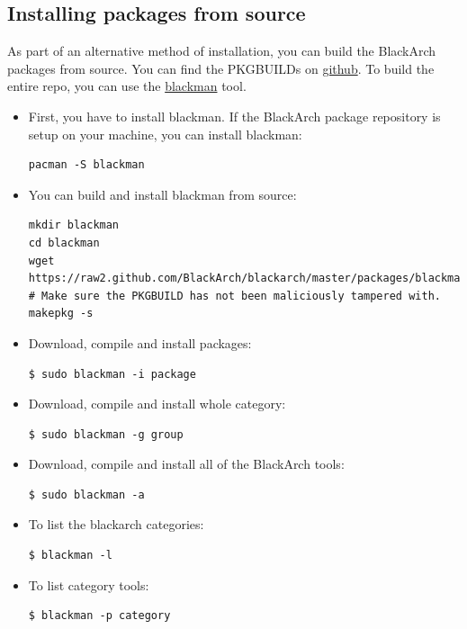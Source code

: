 \documentclass[a4paper, oneside, 11pt]{book}
\begin{document}
\subsection{Installing packages from source}
As part of an alternative method of installation, you can build the BlackArch
packages from source. You can find the PKGBUILDs on
\href{https://github.com/BlackArch/blackarch/tree/master/packages}{github}. To
build the entire repo, you can use the
\href{https://github.com/BlackArch/blackman}{blackman} tool.
\begin{itemize}
\item First, you have to install blackman. If the BlackArch package repository
is setup on your machine, you can install blackman:
{\small
\begin{verbatim}
pacman -S blackman
\end{verbatim}
}
\item You can build and install blackman from source:
{\small
\color{gray}
\begin{verbatim}
mkdir blackman
cd blackman
wget https://raw2.github.com/BlackArch/blackarch/master/packages/blackman/PKGBUILD
# Make sure the PKGBUILD has not been maliciously tampered with.
makepkg -s
\end{verbatim}
}
\item Download, compile and install packages:
{\small
\color{gray}
\begin{verbatim}
$ sudo blackman -i package
\end{verbatim}
}
\item Download, compile and install whole category:
{\small
\color{gray}
\begin{verbatim}
$ sudo blackman -g group
\end{verbatim}
}
\item Download, compile and install all of the BlackArch tools:
{\small
\color{gray}
\begin{verbatim}
$ sudo blackman -a
\end{verbatim}
}
\item To list the blackarch categories:
{\small
\color{gray}
\begin{verbatim}
$ blackman -l
\end{verbatim}
}
\item To list category tools:
{\small
\color{gray}
\begin{verbatim}
$ blackman -p category
\end{verbatim}
}
\end{itemize}
\end{document}
